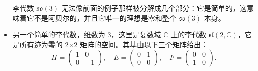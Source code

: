 \begin{itemize}
李代数 \( \mathfrak{so}(3) \) 无法像前面的例子那样被分解成几个部分：它是简单的，这意味着它不是阿贝尔的，并且它唯一的理想是零和整个 \( \mathfrak{so}(3) \) 本身。
\item 另一个简单的李代数，维数为 3，这里是复数域 \( \mathbb{C} \) 上的李代数 \( \mathfrak{sl}(2, \mathbb{C}) \)，它是所有迹为零的 2×2 矩阵的空间。其基由以下三个矩阵给出：
\[
H = \left( \begin{array}{cc} 1 & 0 \\ 0 & -1 \end{array} \right), \quad E = \left( \begin{array}{cc} 0 & 1 \\ 0 & 0 \end{array} \right), \quad F = \left( \begin{array}{cc} 0 & 0 \\ 1 & 0 \end{array} \right).~
\]
\end{itemize}